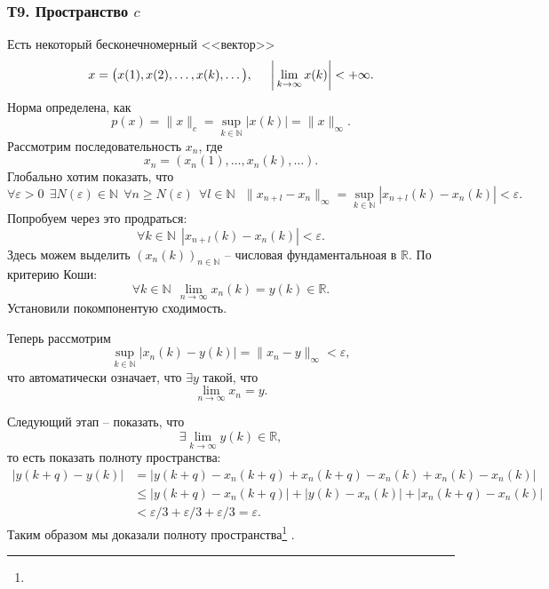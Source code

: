 \subsubsection*{Т9. Пространство \texorpdfstring{$c$}{с}}

Есть некоторый бесконечномерный <<вектор>> 
\begin{equation*}
    x = \big(x(1), x(2), \ldots, x(k), \ldots\big),
    \hspace{5 mm}
    \bigg|
        \lim_{k \to \infty} x(k)
    \bigg| < + \infty.
\end{equation*}
Норма определена, как
\begin{equation*}
    p(x) = \|x\|_c = \sup_{k \in \mathbb{N}} |x(k)| = \|x\|_{\infty}.
\end{equation*}
Рассмотрим последовательность $x_n$, где 
\begin{equation*}
    x_n = (x_n (1), \ldots, x_n(k), \ldots).
\end{equation*}
Глобально хотим показать, что
\begin{equation*}
    \forall \varepsilon > 0 \ \ 
    \exists N(\varepsilon) \in \mathbb{N} \ \ 
    \forall n \geq N(\varepsilon) \ \ 
    \forall l \in \mathbb{N} \ \  \ 
    \|x_{n+l} -x_{n}\|_{\infty} = \sup_{k \in \mathbb{N}} |x_{n+l} (k) - x_n (k)| < \varepsilon.
\end{equation*}
Попробуем через это продраться:
\begin{equation*}
    \forall k \in \mathbb{N} \ \ |x_{n+l} (k) - x_n (k) | < \varepsilon.
\end{equation*}
Здесь можем выделить $(x_n(k))_{n \in \mathbb{N}}$ -- числовая фундаментальноая в $\mathbb{R}$. 
По критерию Коши:
\begin{equation*}
    \forall k \in \mathbb{N} \ \ 
    \lim_{n \to \infty} x_n (k) = y(k) \in \mathbb{R}.
\end{equation*}
Установили покомпонентую сходимость. 

Теперь рассмотрим
\begin{equation*}
    \sup_{k\in \mathbb{N}} |x_n (k) - y(k)| = \|x_n - y\|_{\infty} < \varepsilon,
\end{equation*}
что автоматически означает, что $\exists y$ такой, что
\begin{equation*}
    \lim_{n \to \infty} x_n  = y.
\end{equation*}

Следующий этап -- показать, что
\begin{equation*}
    \exists \lim_{k \to \infty} y(k) \in \mathbb{R},
\end{equation*}
то есть показать полноту пространства:
\begin{align*}
    |y(k+q)-y(k)| 
    &= |y(k+q) - x_n (k+q) + x_n (k+q) - x_n (k) + x_n (k) - x_n (k)|\\
    &\leq |y(k+q)-x_n (k+q)| + |y(k) - x_n (k)| + |x_n (k+q) - x_n (k)| \\
    & < \varepsilon/3 + \varepsilon/3 + \varepsilon/3 = \varepsilon.
\end{align*}
Таким образом мы доказали полноту пространства\footnote{
    \red{$c_0, c_{00}, l_\infty$ -- банаховы ли?}
} . 






